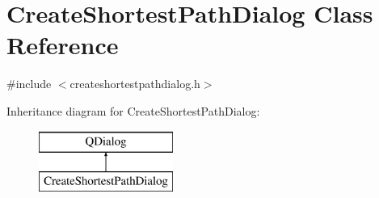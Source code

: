 \hypertarget{class_create_shortest_path_dialog}{}\section{Create\+Shortest\+Path\+Dialog Class Reference}
\label{class_create_shortest_path_dialog}


{\ttfamily \#include $<$createshortestpathdialog.\+h$>$}

Inheritance diagram for Create\+Shortest\+Path\+Dialog\+:\begin{figure}[H]
\begin{center}
\leavevmode
\includegraphics[height=2.000000cm]{df/d17/class_create_shortest_path_dialog}
\end{center}
\end{figure}
